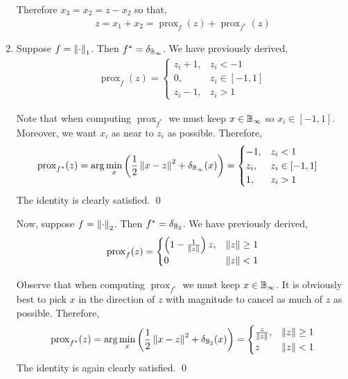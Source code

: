 \documentclass[10pt]{article}
\newcommand{\prox}{\operatorname{prox}}
\begin{document}
\begin{solution}[Solution]
\begin{enumerate}[label=(\alph*)]
        Therefore \( x_3 = x_2 = z-x_2 \) so that,
        \begin{align*}
            z = x_1 + x_2 = \prox_f(z) + \prox_{f^*}(z)
        \end{align*}
        
    \item 
        Suppose \( f = \left\lVert\cdot\right\rVert_1 \). Then \( f^* = \delta_{\mathbb{B}_{\infty}} \). We have previously derived,
        \begin{align*}
            \prox_f(z) = \begin{cases}
                z_i + 1, & z_i < -1 \\ 
                0, & z_i \in [-1,1] \\
                z_i - 1, & z_i > 1
            \end{cases}
        \end{align*}
              
        Note that when computing \( \prox_{f^*} \) we must keep \( x \in \mathbb{B}_\infty \) so \( x_i \in [-1,1] \). Moreover, we want \( x_i \) as near to \( z_i \) as possible. Therefore,
        \begin{align*}
            \prox_{f^*}(z) &= \arg\min_x \left( \frac{1}{2} \norm{x-z}^2 + \delta_{\bB_\infty}(x) \right)
            = \begin{cases}
                -1, &z_i < 1 \\
                z_i, & z_i \in [-1,1] \\
                1, & z_i > 1
            \end{cases}
        \end{align*}
        The identity is clearly satisfied. \qed
        
        Now, suppose \( f = \left\lVert\cdot\right\rVert_2 \). Then \( f^* = \delta_{\mathbb{B}_2} \). We have previously derived,
        \begin{align*}
            \prox_f(z) = 
            \begin{cases}
                \left( 1 - \frac{1}{\norm{z}} \right) z, & \| z \| \geq 1 \\
                0 & \| z \| < 1
            \end{cases}
        \end{align*}

        Observe that when computing \( \prox_{f^*} \) we must keep \( x\in\mathbb{B}_\infty \). It is obviously best to pick \( x \) in the direction of \( z \) with magnitude to cancel as much of \( z \) as possible. Therefore,
        \begin{align*}
            \prox_{f^*}(z) = \arg\min_x \left( \frac{1}{2} \norm{x-z}^2 + \delta_{\bB_2}(x) \right)
            = 
            \begin{cases}
                \frac{z}{\norm{z}}, & \| z \| \geq 1 \\
                z & \| z \| < 1
            \end{cases}
        \end{align*}
        The identity is again clearly satisfied. \qed


\end{enumerate}
\end{solution}
\end{document}
